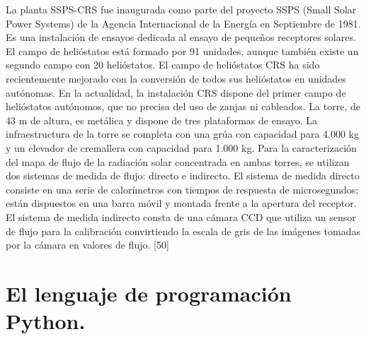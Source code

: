 \documentclass[12pt]{article}
\begin{document}
La planta SSPS-CRS fue inaugurada como parte del proyecto SSPS (Small Solar Power Systems) de la Agencia Internacional de la Energía en Septiembre de 1981.
Es una instalación de ensayos dedicada al ensayo de pequeños receptores solares. El campo de helióstatos está formado por 91 unidades, aunque también existe un segundo campo con 20 helióstatos.
El campo de helióstatos CRS ha sido recientemente mejorado con la conversión de todos sus helióstatos en unidades autónomas. En la actualidad, la instalación CRS dispone del primer campo de helióstatos autónomos, que no precisa del uso de zanjas ni cableados.
La torre, de 43 m de altura, es metálica y dispone de tres plataformas de ensayo.
La infraestructura de la torre se completa con una grúa con capacidad para 4.000 kg y un elevador de cremallera con capacidad para 1.000 kg.
Para la caracterización del mapa de flujo de la radiación solar concentrada en ambas torres, se utilizan dos sistemas de medida de flujo: directo e indirecto. El sistema de medida directo consiste en una serie de calorímetros con tiempos de respuesta de microsegundos; están dispuestos en una barra móvil y montada frente a la apertura del receptor. El sistema de medida indirecto consta de una cámara CCD que utiliza un sensor de flujo para la calibración convirtiendo la escala de gris de las imágenes tomadas por la cámara en valores de flujo. [50]



\section{El lenguaje de programación Python.}
\end{document}

